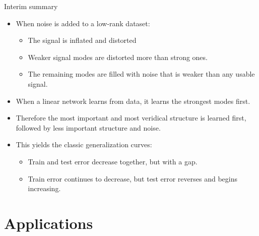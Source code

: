 \documentclass{beamer}
\begin{document}
\begin{frame}{Interim summary}
\begin{itemize}[<+->]
\item When noise is added to a low-rank dataset: 
    \begin{itemize}
    \item The signal is inflated and distorted
    \item Weaker signal modes are distorted more than strong ones.
    \item The remaining modes are filled with noise that is weaker than any usable signal.  
    \end{itemize}
\item When a linear network learns from data, it learns the strongest modes first.
\item Therefore the most important and most veridical structure is learned first, followed by less important structure and noise.
\item This yields the classic generalization curves:
    \begin{itemize}
    \item Train and test error decrease together, but with a gap. 
    \item Train error continues to decrease, but test error reverses and begins increasing. 
    \end{itemize}
\end{itemize}
\end{frame}

\section{Applications}
\end{document}
